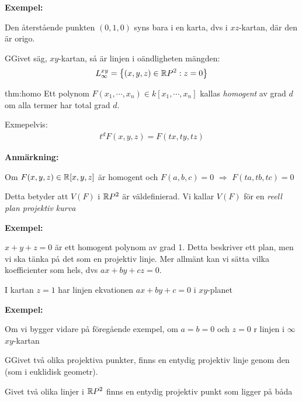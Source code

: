 \par\bigskip
\noindent\textbf{Exempel:}\par
\noindent Den återstående punkten $(0,1,0)$ syns bara i en karta, dvs i $xz$-kartan, där den är origo.
\par\bigskip
\begin{theo}
  GGivet säg, $xy$-kartan, så är linjen i oändligheten mängden:
  \begin{equation*}
    \begin{gathered}
      L_{\infty}^{xy} = \left\{(x,y,z)\in\mathbb{R} P^2 : z=0\right\}
    \end{gathered}
  \end{equation*}
\end{theo}
\par\bigskip
\begin{theo}{thm:homo}
  Ett polynom $F(x_1,\cdots,x_n)\in k[x_1,\cdots, x_n]$ kallas \textit{homogent} av grad $d$ om alla termer har total grad $d$.\par
  \noindent Exmepelvis:
  \begin{equation*}
    \begin{gathered}
      t^dF(x,y,z)=F(tx,ty,tz)
    \end{gathered}
  \end{equation*}
\end{theo}
\par\bigskip
\noindent\textbf{Anmärkning:}\par
\noindent Om $F(x,y,z)\in\mathbb{R}[x,y,z]$ är homogent och $F(a,b,c)=0$ $\Rightarrow$ $F(ta,tb,tc)=0$\par
\noindent Detta betyder att $V(F)$ i $\mathbb{R} P^2$ är väldefinierad. Vi kallar $V(F)$ för en \textit{reell plan projektiv kurva} 
\par\bigskip
\noindent\textbf{Exempel:}\par
\noindent $x+y+z=0$ är ett homogent polynom av grad 1. Detta beskriver ett plan, men vi ska tänka på det som en projektiv linje. Mer allmänt kan vi sätta vilka koefficienter som hels, dvs $ax+by+cz=0$.\par
\noindent I kartan $z=1$ har linjen ekvationen $ax+by+c=0$ i $xy$-planet
\par\bigskip
\noindent\textbf{Exempel:}\par
\noindent Om vi bygger vidare på föregående exempel, om $a=b=0$ och $z=0$ r linjen i $\infty$ $xy$-kartan
\par\bigskip
\begin{theo}
  GGivet två olika projektiva punkter, finns en entydig projektiv linje genom den (som i euklidisk geometr).
  \par\bigskip
  \noindent Givet två olika linjer i $\mathbb{R} P^2$ finns en entydig projektiv punkt som ligger på båda
\end{theo}
